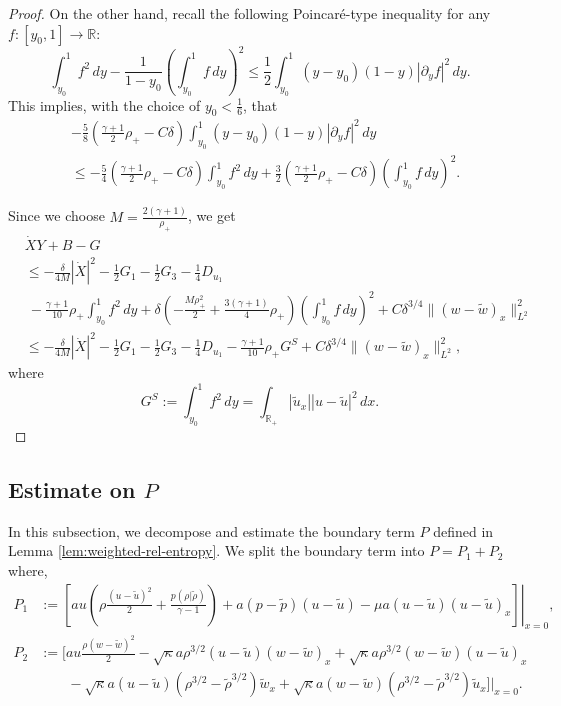 \documentclass[11pt,reqno]{amsart}
\numberwithin{equation}{section} %
\newcommand{\R}{\mathbb{R}}
\newcommand{\pa}{\partial}
\begin{document}
\begin{proof}
On the other hand, recall the following Poincar\'e-type inequality \cite{HKKL25-JMAA} for any $f:[y_0,1]\to\R$:
\begin{equation*}
    \int_{y_0}^1 f^2 \, dy - \frac{1}{1-y_0}\left(\int_{y_0}^1 f \, dy \right)^2 \leq \frac{1}{2}\int_{y_0}^1 (y-y_0)(1-y)|\partial_y f|^2 \, dy.
\end{equation*}
This implies, with the choice of $y_0 < \frac{1}{6}$, that
\begin{align*}
	&-\frac{5}{8}\left(\frac{\gamma+1}{2}\rho_+-C\delta\right)\int_{y_0}^1(y-y_0)(1-y)|\pa_yf|^2\,dy\\
	&\le-\frac{5}{4}\left(\frac{\gamma+1}{2}\rho_+-C\delta\right)\int_{y_0}^1f^2\,dy+\frac{3}{2}\left(\frac{\gamma+1}{2}\rho_+-C\delta\right)\left(\int_{y_0}^1f\,dy\right)^2.
\end{align*}

Since we choose $M=\frac{2(\gamma+1)}{\rho_+}$, we get
\begin{align*}
	&\dot{X}Y+B-G\\&\le -\frac{\delta}{4M}|\dot{X}|^2-\frac{1}{2}G_1-\frac{1}{2}G_3-\frac{1}{4}D_{u_1}\\
	&\ -\frac{\gamma+1}{10}\rho_+\int_{y_0}^1f^2\,dy +\delta\left(-\frac{M\rho_+^2}{2}+\frac{3(\gamma+1)}{4}\rho_+\right)\left(\int_{y_0}^1f\,dy\right)^2+C\delta^{3/4}\|(w-\tilde{w})_x\|_{L^2}^2\\
	&\le -\frac{\delta}{4M}|\dot{X}|^2-\frac{1}{2}G_1-\frac{1}{2}G_3-\frac{1}{4}D_{u_1} -\frac{\gamma+1}{10}\rho_+G^S+C\delta^{3/4}\|(w-\tilde{w})_x\|_{L^2}^2,
\end{align*}
where
\[G^S:=\int_{y_0}^1 f^2\,dy=\int_{\R_+}|\tilde{u}_x||u-\tilde{u}|^2\,dx.\]

\end{proof}

\subsection{Estimate on \texorpdfstring{$P$}{P}}%

In this subsection, we decompose and estimate the boundary term $P$ defined in Lemma \ref{lem:weighted-rel-entropy}. We split the boundary term into $P = P_1 + P_2$ where,
\begin{align*}
    P_1 &:= \left. \left[ a u \left(\rho  \frac{(u-\tilde{u})^2}{2} + \frac{p(\rho|\tilde{\rho})}{\gamma-1} \right) + a (p-\tilde{p}) (u-\tilde{u}) - \mu a (u-\tilde{u}) (u-\tilde{u})_x \right]\right|_{x=0}, \\
    P_2 &:= \bigg[ a u \frac{\rho (w-\tilde{w})^2}{2} - \sqrt{\kappa} a \rho^{3/2} (u-\tilde{u})(w-\tilde{w})_x + \sqrt{\kappa} a \rho^{3/2} (w-\tilde{w})(u-\tilde{u})_x \\
    &\qquad - \sqrt{\kappa} a(u-\tilde{u})(\rho^{3/2}-\tilde{\rho}^{3/2})\tilde{w}_x + \sqrt{\kappa} a(w-\tilde{w})(\rho^{3/2}-\tilde{\rho}^{3/2})\tilde{u}_x \bigg]\bigg|_{x=0}.
\end{align*}
\end{document}

